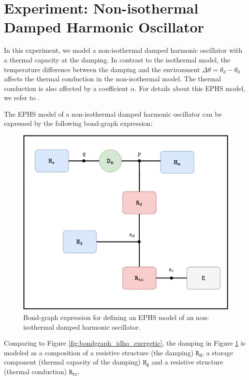 \documentclass[
	parskip, 			   %
	twoside, 			   %
	DIV=14, 			   %
	BCOR=15.0mm, 		   %
	headsepline, 		   %
	open=right, 		   %
	captions=tableheading, %
	bibliography=totoc,    %
	numbers=noenddot       %
]{scrreprt}
\begin{document}
\clearpage
\section{Experiment: Non-isothermal Damped Harmonic Oscillator}
In this experiment, we model a non-isothermal damped harmonic oscillator with a thermal capacity at the damping. In contrast to the isothermal model, the temperature difference between the damping and the environment $\Delta\theta = \theta_d - \theta_0$ affects the thermal conduction in the non-isothermal model. The thermal conduction is also affected by a coefficient $\alpha$. For details about this EPHS model, we refer to \cite{lohmayer2021exergetic}.

The EPHS model of a non-isothermal damped harmonic oscillator can be expressed by  the following bond-graph expression: 

\begin{figure}[h!]
    \centering
    \includegraphics[scale=0.6]{figures/bondgraph_ndho_exergetic.pdf}
    \caption{Bond-graph expression for defining an EPHS model of an non-isothermal damped harmonic oscillator.}
    \label{fig:bondgraph_ndho_exergetic}
\end{figure}

Comparing to Figure \ref{fig:bondgraph_idho_exergetic}, the damping in Figure \ref{fig:bondgraph_ndho_exergetic} is modeled as a composition of a resistive structure (the damping) $\mathtt{R_d}$, a storage component (thermal capacity of the damping) $\mathtt{H_d}$ and a resistive structure (thermal conduction) $\mathtt{R_{tc}}$. 
\end{document}
